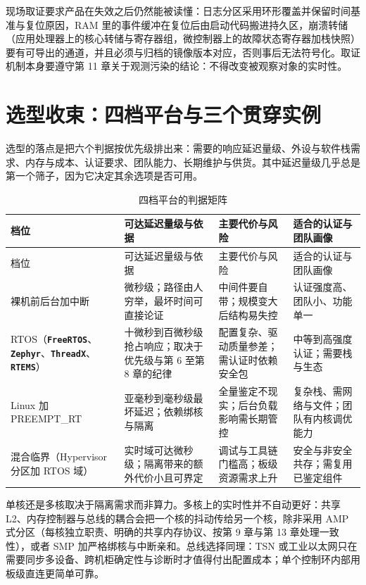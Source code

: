\documentclass[12pt,a4paper,fontset=fandol]{ctexbook}
\newcommand{\Lib}[1]{\textbf{\texttt{#1}}}
\newcommand{\Lang}[1]{\textsf{#1}}
\begin{document}
现场取证要求产品在失效之后仍然能被读懂：日志分区采用环形覆盖并保留时间基准与复位原因，RAM 里的事件缓冲在复位后由启动代码搬进持久区，崩溃转储（应用处理器上的核心转储与寄存器组，微控制器上的故障状态寄存器加栈快照）要有可导出的通道，并且必须与归档的镜像版本对应，否则事后无法符号化。取证机制本身要遵守第 11 章关于观测污染的结论：不得改变被观察对象的实时性。

\section{选型收束：四档平台与三个贯穿实例}
\label{sec:ch14-platform-choice}

选型的落点是把六个判据按优先级排出来：需要的响应延迟量级、外设与软件栈需求、内存与成本、认证要求、团队能力、长期维护与供货。其中延迟量级几乎总是第一个筛子，因为它决定其余选项是否可用。

\begin{longtable}{>{\raggedright\arraybackslash}p{}>{\raggedright\arraybackslash}p{}>{\raggedright\arraybackslash}p{}>{\raggedright\arraybackslash}p{}}
\caption{四档平台的判据矩阵}\label{tab:ch14-platform}\\
\toprule
档位 & 可达延迟量级与依据 & 主要代价与风险 & 适合的认证与团队画像 \\
\midrule
\endfirsthead
\toprule
档位 & 可达延迟量级与依据 & 主要代价与风险 & 适合的认证与团队画像 \\
\midrule
\endhead
\bottomrule
\endfoot
\endlastfoot
裸机前后台加中断 & 微秒级；路径由人穷举，最坏时间可直接论证 & 中间件要自带；规模变大后结构易失控 & 认证强度高、团队小、功能单一 \\
RTOS（\Lib{FreeRTOS}、\Lib{Zephyr}、\Lib{ThreadX}、\Lib{RTEMS}） & 十微秒到百微秒级抢占响应；取决于优先级与第 6 至第 8 章的纪律 & 配置复杂、驱动质量参差；需认证时依赖安全包 & 中等到高强度认证；需要栈与生态 \\
\Lang{Linux} 加 PREEMPT\_RT & 亚毫秒到毫秒级最坏延迟；依赖绑核与隔离 & 全量鉴定不现实；后台负载影响需长期管控 & 复杂栈、需网络与文件；团队有内核调优能力 \\
混合临界（Hypervisor 分区加 RTOS 域） & 实时域可达微秒级；隔离带来的额外代价小且可界定 & 调试与工具链门槛高；板级资源需求上升 & 安全与非安全共存；需复用已鉴定组件 \\
\end{longtable}

单核还是多核取决于隔离需求而非算力。多核上的实时性并不自动更好：共享 L2、内存控制器与总线的耦合会把一个核的抖动传给另一个核，除非采用 AMP 式分区（每核独立职责、明确的共享内存协议、按第 9 章与第 13 章处理一致性），或者 SMP 加严格绑核与中断亲和。总线选择同理：TSN 或工业以太网只在需要同步多设备、跨机柜确定性与诊断时才值得付出配置成本；单个控制环内部用板级直连更简单可靠。
\end{document}
